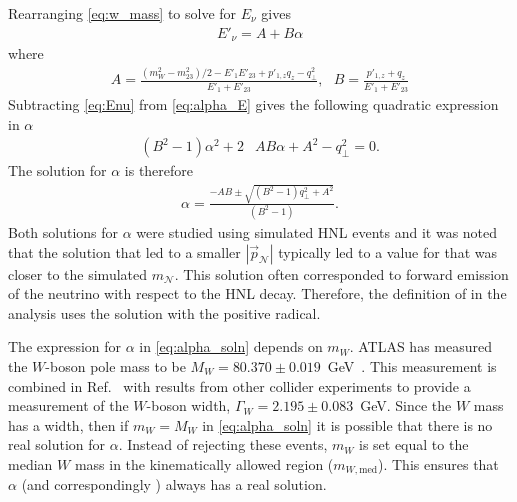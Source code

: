 Rearranging \cref{eq:w_mass} to solve for $E_\nu$ gives
%
\begin{align}
E'_\nu = A  + B\alpha \label{eq:Enu}
\end{align}
% 
where
\begin{align}
A = \frac{(m_W^2 - m_{23}^2)/2 - E'_1E'_{23} + p'_{1,z}q_z - q_{\perp}^2}{E'_1 + E'_{23}}, \ \ \ B = \frac{p'_{1,z} + q_z}{E'_1 + E'_{23}} \nonumber
\end{align}
%
Subtracting \cref{eq:Enu} from \cref{eq:alpha_E} gives the following quadratic expression in $\alpha$
%
\begin{align}
 (B^2 -1)\alpha^2 + 2&AB\alpha + A^2 - q_{\perp}^2 = 0.   \nonumber  %
\end{align}
%
The solution for $\alpha$ is therefore
\begin{align}
\alpha= \frac{-AB \pm \sqrt{(B^2-1)q_{\perp}^2 + A^2}}{(B^2-1)}. \label{eq:alpha_soln}
\end{align}
%
Both solutions for $\alpha$ were studied using simulated HNL events and it was noted that the solution that led to a smaller $|\vec{p}_\mathcal{N}|$ typically led to a value for \mhnl that was closer to the simulated $m_\mathcal{N}$. This solution often corresponded to forward emission of the neutrino with respect to the HNL decay. Therefore, the definition of \mhnl in the analysis uses the solution with the positive radical.

The expression for $\alpha$ in \cref{eq:alpha_soln} depends on $m_W$.
ATLAS has measured the $W$-boson pole mass to be $M_W=80.370 \pm 0.019$~GeV~\cite{STDM-2014-18}. This measurement is combined in Ref.~\cite{ParticleDataGroup:2020ssz} with results from other collider experiments to provide a measurement of the $W$-boson width, $\Gamma_W = 2.195 \pm 0.083$~GeV.
Since the $W$ mass has a width, then if $m_W= M_W$ in \cref{eq:alpha_soln} it is possible that there is no real solution for $\alpha$.
Instead of rejecting these events, $m_W$ is set equal to the median $W$ mass in the kinematically allowed region ($m_{W, \mathrm{med}}$). This ensures that $\alpha$ (and correspondingly \mhnl) always has a real solution.

